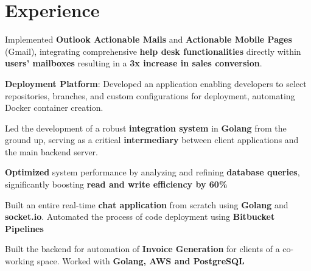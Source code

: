 \documentclass{deedy-resume-openfont}
\begin{document}
\hfill
\begin{minipage}[t]{0.66\textwidth} 


\section{Experience}

\vspace{\topsep} %
\begin{tightemize}
\item Implemented \textbf{Outlook Actionable Mails} and \textbf{Actionable Mobile Pages} (Gmail), integrating comprehensive \textbf{help desk functionalities} directly within \textbf{users' mailboxes} resulting in a \textbf{3x increase in sales conversion}.
\item \textbf{Deployment Platform}: Developed an application enabling developers to select repositories, branches, and custom configurations for deployment, automating Docker container creation.
\item Led the development of a robust \textbf{integration system} in \textbf{Golang} from the ground up, serving as a critical \textbf{intermediary} between client applications and the main backend server.
\item  \textbf{Optimized} system performance by analyzing and refining \textbf{database queries}, significantly boosting \textbf{read and write efficiency by 60\%}
\end{tightemize}
\sectionsep

\begin{tightemize}
\item Built an entire real-time \textbf{chat application} from scratch using \textbf{Golang} and \textbf{socket.io}. Automated the process of code deployment using \textbf{Bitbucket Pipelines}
\item Built the backend for automation of \textbf{Invoice Generation} for clients of a co-working space. Worked with \textbf{Golang, AWS and PostgreSQL}
\end{tightemize}
\sectionsep


\end{minipage}
\end{document}
